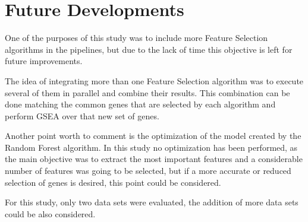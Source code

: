 
\section{Future Developments}

One of the purposes of this study was to include more Feature Selection algorithms in the pipelines, but due to the lack of time this objective is left for future improvements.

The idea of integrating more than one Feature Selection algorithm was to execute several of them in parallel and combine their results. This combination can be done matching the common genes that are selected by each algorithm and perform GSEA over that new set of genes.

Another point worth to comment is the optimization of the model created by the Random Forest algorithm. In this study no optimization has been performed, as the main objective was to extract the most important features and a considerable number of features was going to be selected, but if a more accurate or reduced selection of genes is desired, this point could be considered.

For this study, only two data sets were evaluated, the addition of more data sets could be also considered.

